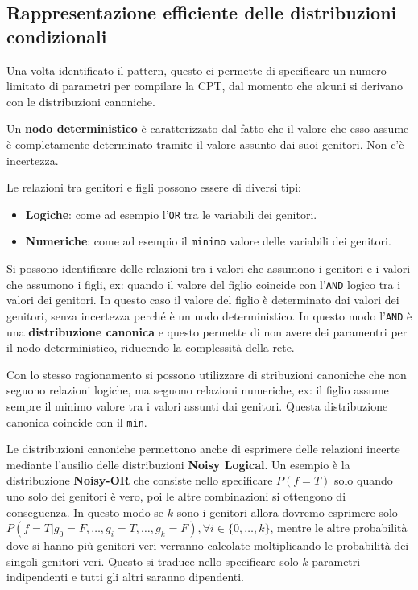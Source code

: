 \subsection{Rappresentazione efficiente delle distribuzioni condizionali}

Una volta identificato il pattern, questo ci permette di specificare un numero
limitato di parametri per compilare la CPT, dal momento che alcuni si derivano
con le distribuzioni canoniche.
\begin{definizione}
    Un \textbf{nodo deterministico} è caratterizzato dal fatto che il valore che
    esso assume è completamente determinato tramite il valore assunto dai suoi
    genitori. Non c'è incertezza.
\end{definizione}
Le relazioni tra genitori e figli possono essere di diversi tipi:
\begin{itemize}
    \item \textbf{Logiche}: come ad esempio l'\texttt{OR} tra le variabili dei
          genitori.
    \item \textbf{Numeriche}: come ad esempio il \texttt{minimo} valore delle
          variabili dei genitori.
\end{itemize}

Si possono identificare delle relazioni tra i valori che assumono i genitori e 
i valori che assumono i figli, ex: quando il valore del figlio coincide con l'\texttt{AND}
logico tra i valori dei genitori. In questo caso il valore del figlio è determinato 
dai valori dei genitori, senza incertezza perché è un nodo deterministico. In questo 
modo l'\texttt{AND} è una \textbf{distribuzione canonica} e questo permette di 
non avere dei paramentri per il nodo deterministico, riducendo la complessità 
della rete. 

Con lo stesso ragionamento si possono utilizzare di stribuzioni canoniche che non 
seguono relazioni logiche, ma seguono relazioni numeriche, ex: il figlio assume 
sempre il minimo valore tra i valori assunti dai genitori.  Questa distribuzione 
canonica coincide con il \texttt{min}.

Le distribuzioni canoniche permettono anche di esprimere delle relazioni incerte 
mediante l'ausilio delle distribuzioni \textbf{Noisy Logical}. Un esempio è la 
distribuzione \textbf{Noisy-OR} che consiste nello specificare $P(f = T)$ solo 
quando uno solo dei genitori è vero, poi le altre combinazioni si ottengono 
di conseguenza. In questo modo se $k$ sono i genitori allora dovremo esprimere 
solo $P(f=T | g_0 = F, \dots, g_i = T, \dots, g_k=F), \forall i \in \{0,\dots, k\}$,
mentre le altre probabilità dove si hanno più genitori veri verranno calcolate 
moltiplicando le probabilità dei singoli genitori veri. Questo si traduce nello specificare 
solo $k$ parametri indipendenti e tutti gli altri saranno dipendenti. 

